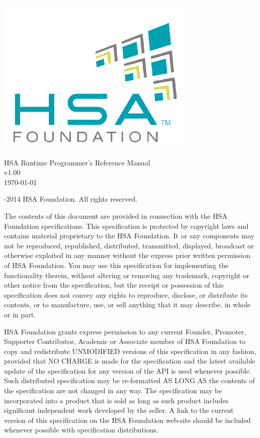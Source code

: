 \documentclass[final,oneside]{book}
\newcommand{\doctitle}{HSA Runtime Programmer's Reference Manual}
\begin{document}
\providecommand{\DIFadd}[1]{{\protect\color{Cerulean}#1}}
\renewcommand{\DIFadd}[1]{{\protect\color{Cerulean}#1}}

\providecommand{\DIFdel}[1]{{\protect\color{red}\sout{\mbox{#1}}}}
\renewcommand{\DIFdel}[1]{{\protect\color{red}\sout{\mbox{#1}}}}

\begin{titlepage}
\includegraphics[width=.4\textwidth]{fig/foundation.png}
\vspace*{7cm}
\begin{center}
{\Large \doctitle\\[1ex]\large v1.00}\\ \vspace*{1cm}
\vspace*{0.5cm}
{\small \today}
\end{center}
\end{titlepage}
\thispagestyle{empty} {-2014 HSA Foundation. All rights
  reserved.}


The contents of this document are provided in connection with the HSA Foundation
specifications. This specification is protected by copyright laws and contains
material proprietary to the HSA Foundation. It or any components may not be
reproduced, republished, distributed, transmitted, displayed, broadcast or
otherwise exploited in any manner without the express prior written permission
of HSA Foundation. You may use this specification for implementing the
functionality therein, without altering or removing any trademark, copyright or
other notice from the specification, but the receipt or possession of this
specification does not convey any rights to reproduce, disclose, or distribute
its contents, or to manufacture, use, or sell anything that it may describe, in
whole or in part.

HSA Foundation grants express permission to any current Founder, Promoter,
Supporter Contributor, Academic or Associate member of HSA Foundation to copy
and redistribute UNMODIFIED versions of this specification in any fashion,
provided that NO CHARGE is made for the specification and the latest available
update of the specification for any version of the API is used whenever
possible. Such distributed specification may be re-formatted AS LONG AS the
contents of the specification are not changed in any way. The specification may
be incorporated into a product that is sold as long as such product includes
significant independent work developed by the seller. A link to the current
version of this specification on the HSA Foundation web-site should be included
whenever possible with specification distributions.
\end{document}
